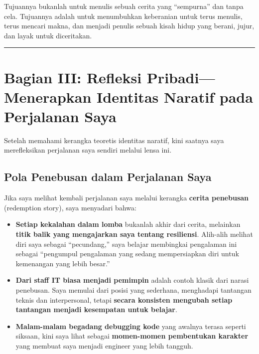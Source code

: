 \documentclass[
  letterpaper,
  DIV=11,
  numbers=noendperiod]{scrreprt}
\begin{document}
Tujuannya bukanlah untuk menulis sebuah cerita yang ``sempurna'' dan
tanpa cela. Tujuannya adalah untuk menumbuhkan keberanian untuk terus
menulis, terus mencari makna, dan menjadi penulis sebuah kisah hidup
yang berani, jujur, dan layak untuk diceritakan.

\begin{center}\rule{0.5\linewidth}{0.5pt}\end{center}

\section{\texorpdfstring{\textbf{Bagian III: Refleksi
Pribadi---Menerapkan Identitas Naratif pada Perjalanan
Saya}}{Bagian III: Refleksi Pribadi---Menerapkan Identitas Naratif pada Perjalanan Saya}}\label{bagian-iii-refleksi-pribadimenerapkan-identitas-naratif-pada-perjalanan-saya}

Setelah memahami kerangka teoretis identitas naratif, kini saatnya saya
merefleksikan perjalanan saya sendiri melalui lensa ini.

\subsection{\texorpdfstring{\textbf{Pola Penebusan dalam Perjalanan
Saya}}{Pola Penebusan dalam Perjalanan Saya}}\label{pola-penebusan-dalam-perjalanan-saya}

Jika saya melihat kembali perjalanan saya melalui kerangka
\textbf{cerita penebusan} (redemption story), saya menyadari bahwa:

\begin{itemize}
\item
  \textbf{Setiap kekalahan dalam lomba} bukanlah akhir dari cerita,
  melainkan \textbf{titik balik yang mengajarkan saya tentang
  resiliensi}. Alih-alih melihat diri saya sebagai ``pecundang,'' saya
  belajar membingkai pengalaman ini sebagai ``pengumpul pengalaman yang
  sedang mempersiapkan diri untuk kemenangan yang lebih besar.''
\item
  \textbf{Dari staff IT biasa menjadi pemimpin} adalah contoh klasik
  dari narasi penebusan. Saya memulai dari posisi yang sederhana,
  menghadapi tantangan teknis dan interpersonal, tetapi \textbf{secara
  konsisten mengubah setiap tantangan menjadi kesempatan untuk belajar}.
\item
  \textbf{Malam-malam begadang debugging kode} yang awalnya terasa
  seperti siksaan, kini saya lihat sebagai \textbf{momen-momen
  pembentukan karakter} yang membuat saya menjadi engineer yang lebih
  tangguh.
\end{itemize}
\end{document}
